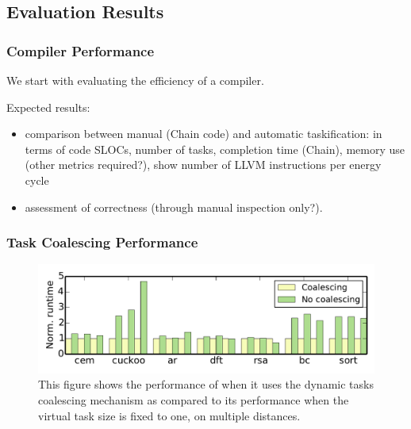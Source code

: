 \subsection{Evaluation Results}
\label{sec:results_evaluation}

\subsubsection{Compiler Performance}
\label{sec:results_compiler}

We start with evaluating the efficiency of a \sys compiler. 

Expected results:
\begin{itemize}
	\item comparison between manual (Chain code) and automatic taskification: in terms of code SLOCs, number of tasks, completion time (Chain), memory use (other metrics required?), show number of LLVM instructions per energy cycle
	\item assessment of correctness (through manual inspection only?).
\end{itemize}


\subsubsection{Task Coalescing Performance}
\label{sec:results_coalescing}

\begin{figure}
	\centering
	\includegraphics[width=\columnwidth]{figures/coalescing}
	\caption{This figure shows the performance of \sys when it uses the dynamic tasks coalescing mechanism as compared to its performance when the virtual task size is fixed to one, on multiple distances. }
	\label{fig:coalescing}
\end{figure}

